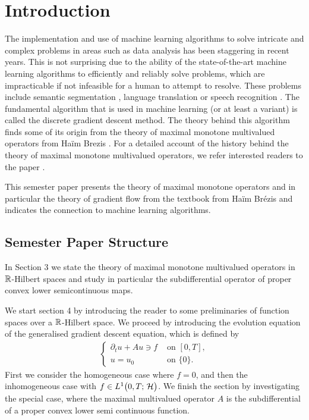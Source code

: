 \section{Introduction}
The implementation and use of machine learning algorithms to solve
intricate and complex problems in areas such as data analysis
has been staggering in recent years. 
This is not surprising due to the ability of the state-of-the-art
machine learning algorithms to efficiently and reliably solve
problems, which are impracticable if not infeasible
for a human to attempt to resolve. These problems include
semantic segmentation \cite{DBLP:journals/corr/BadrinarayananK15},
language translation \cite{edunov2018understanding}
or speech recognition \cite{park2020improved}. 
The fundamental algorithm that is used in machine learning (or at least a variant) is called the discrete gradient descent method.
The theory behind this algorithm finds some of its origin 
from the theory of maximal monotone multivalued operators 
from Haïm Brezis \cite{brezis1973ope}.
For a detailed account of the history behind the theory
of maximal monotone multivalued operators, we
refer interested readers to the paper \cite{borwein2010fifty}.\medskip

This semester paper presents the theory of
maximal monotone operators and in particular
the theory of gradient flow
from the textbook \cite{brezis1973ope} from Haïm Brézis
and indicates the connection to machine learning algorithms.\medskip

\subsection{Semester Paper Structure}
In Section 3 we state the theory of maximal monotone multivalued
operators in $ \mathbb{R} $-Hilbert spaces and study
in particular the subdifferential operator of 
proper convex lower semicontinuous maps.\smallskip

We start section 4 by introducing the reader to
some preliminaries of function spaces over
a $ \mathbb{R} $-Hilbert space. We proceed by
introducing the evolution equation
of the generalised gradient descent equation,
which is defined by
\begin{align*}
	\begin{cases}
		\partial_t u+Au \ni f & \text{ on }[0,T],\\
		u=u_0 & \text{ on }\{0\}.
	\end{cases}
\end{align*}
First we consider the homogeneous case where $ f=0 $,
and then the inhomogeneous case with 
$ f\in L^{1}\big(0,T;\,\mathcal{H}\big) $. We finish the section by investigating the special case, 
where the maximal multivalued operator $ A $
is the subdifferential of a proper
convex lower semi continuous function.\smallskip 

